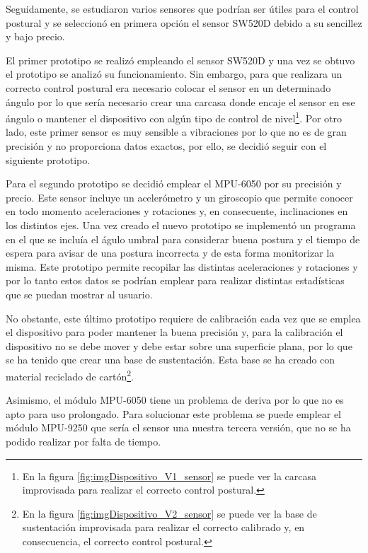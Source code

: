 Seguidamente, se estudiaron varios sensores que podrían ser útiles para el control postural y se seleccionó en primera opción el sensor SW520D debido a su sencillez y bajo precio.

El primer prototipo se realizó empleando el sensor SW520D y una vez se obtuvo el prototipo se analizó su funcionamiento. Sin embargo, para que realizara un correcto control postural era necesario colocar el sensor en un determinado ángulo por lo que sería necesario crear una carcasa donde encaje el sensor en ese ángulo o mantener el dispositivo con algún tipo de control de nivel\footnote{En la figura \ref{fig:imgDispositivo_V1_sensor} se puede ver la carcasa improvisada para realizar el correcto control postural.}. Por otro lado, este primer sensor es muy sensible a vibraciones por lo que no es de gran precisión y no proporciona datos exactos, por ello, se decidió seguir con el siguiente prototipo.

Para el segundo prototipo se decidió emplear el MPU-6050 por su precisión y precio. Este sensor incluye un acelerómetro y un giroscopio que permite conocer en todo momento aceleraciones y rotaciones y, en consecuente, inclinaciones en los distintos ejes. Una vez creado el nuevo prototipo se implementó un programa en el que se incluía el águlo umbral para considerar buena postura y el tiempo de espera para avisar de una postura incorrecta y de esta forma monitorizar la misma. Este prototipo permite recopilar las distintas aceleraciones y rotaciones y por lo tanto estos datos se podrían emplear para realizar distintas estadísticas que se puedan mostrar al usuario.

No obstante, este último prototipo requiere de calibración cada vez que se emplea el dispositivo para poder mantener la buena precisión y, para la calibración el dispositivo no se debe mover y debe estar sobre una superficie plana, por lo que se ha tenido que crear una base de sustentación. Esta base se ha creado con material reciclado de cartón\footnote{En la figura \ref{fig:imgDispositivo_V2_sensor} se puede ver la base de sustentación improvisada para realizar el correcto calibrado y, en consecuencia, el correcto control postural.}.

Asimismo, el módulo MPU-6050 tiene un problema de deriva por lo que no es apto para uso prolongado. Para solucionar este problema se puede emplear el módulo MPU-9250 que sería el sensor una nuestra tercera versión, que no se ha podido realizar por falta de tiempo.




